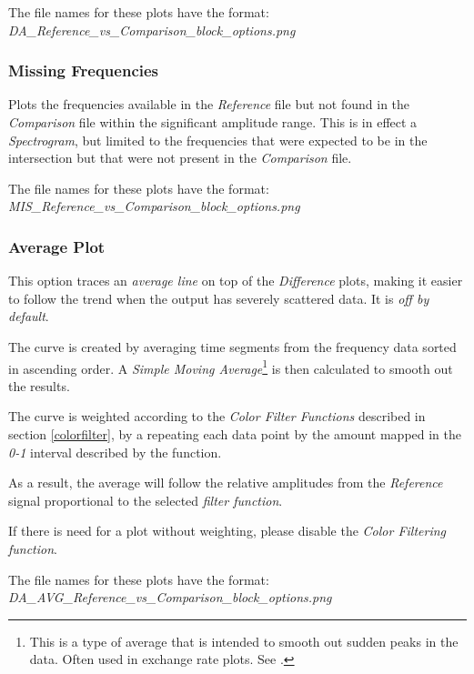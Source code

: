 \documentclass[10pt,a4paper]{report}
\begin{document}
\begin{appendices}
The file names for these plots have the format:\\ \textit{DA\_Reference\_vs\_Comparison\_block\_options.png}

\subsubsection{Missing Frequencies} 

Plots the frequencies available in the \textit{Reference} file but not found in the \textit{Comparison} file within the significant amplitude range. This is in effect a \textit{Spectrogram}, but limited to the frequencies that were expected to be in the intersection but that were not present in the \textit{Comparison} file.

The file names for these plots have the format:\\ \textit{MIS\_Reference\_vs\_Comparison\_block\_options.png}

\subsubsection{Average Plot}
\label{averaged}

This option traces an \textit{average line} on top of the \textit{Difference} plots, making it easier to follow the trend when the output has severely scattered data. It is \textit{off by default}.

The curve is created by averaging time segments from the frequency data sorted in ascending order. A \textit{Simple Moving Average}\footnote{This is a type of average that is intended to smooth out sudden peaks in the data. Often used in exchange rate plots. See \cite{sma}.} is then calculated to smooth out the results.

The curve is weighted according to the \textit{Color Filter Functions} described in section \ref{colorfilter}, by a repeating each data point by the amount mapped in the \textit{0-1} interval described by the function.

As a result, the average will follow the relative amplitudes from the \textit{Reference} signal proportional to the selected \textit{filter function}.

If there is need for a plot without weighting, please disable the \textit{Color Filtering function}.

The file names for these plots have the format:\\ \textit{DA\_AVG\_Reference\_vs\_Comparison\_block\_options.png}


\end{appendices}
\end{document}
